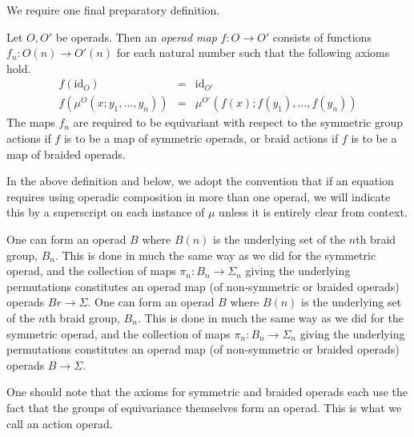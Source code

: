 \documentclass{amsbook} %
\numberwithin{section}{chapter}
\begin{document}
We require one final preparatory definition.

\begin{Defi}
Let $O,O'$ be operads.  Then an \textit{operad map} $f:O \rightarrow O'$ consists of functions $f_{n}:O(n) \rightarrow O'(n)$ for each natural number such that the following axioms hold.
\[
\begin{array}{rcl}
f(\textrm{id}_{O}) & = & \textrm{id}_{O'} \\
f(\mu^{O}(x; y_{1}, \ldots, y_{n})) & = & \mu^{O'}(f(x); f(y_{1}), \ldots, f(y_{n}))
\end{array}
\]
The maps $f_{n}$ are required to be equivariant with respect to the symmetric group actions if $f$ is to be a map of symmetric operads, or braid actions if $f$ is to be a map of braided operads.
\end{Defi}

\begin{conv}
In the above definition and below, we adopt the convention that if an equation requires using operadic composition in more than one operad, we will indicate this by a superscript on each instance of $\mu$ unless it is entirely clear from context.
\end{conv}

\begin{example}
One can form an operad $B$ where $B(n)$ is the underlying set of the $n$th braid group, $B_{n}$.  This is done in much the same way as we did for the symmetric operad, and the collection of maps $\pi_{n}:B_{n} \rightarrow \Sigma_{n}$ giving the underlying permutations constitutes an operad map (of non-symmetric or braided operads) operads $Br \rightarrow \Sigma$.
One can form an operad $B$ where $B(n)$ is the underlying set of the $n$th braid group, $B_{n}$.  This is done in much the same way as we did for the symmetric operad, and the collection of maps $\pi_{n}:B_{n} \rightarrow \Sigma_{n}$ giving the underlying permutations constitutes an operad map (of non-symmetric or braided operads) operads $B \rightarrow \Sigma$.
\end{example}

One should note that the axioms for symmetric and braided operads each use the fact that the groups of equivariance themselves form an operad.  This is what we call an action operad.
\end{document}

